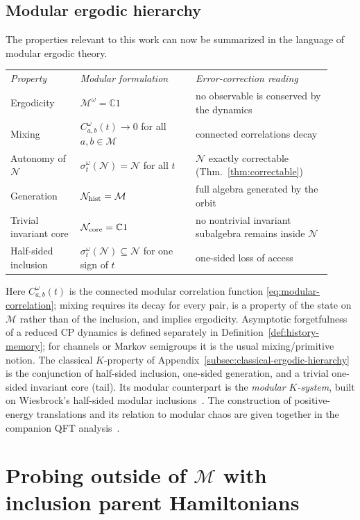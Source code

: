 \documentclass[a4paper,11pt]{article}
\theoremstyle{definition}
\newcommand{\mN}{\mathcal{N}}
\newcommand{\mM}{\mathcal{M}}
\begin{document}
\subsection{Modular ergodic hierarchy}\label{subsec:QEC-hierarchy}

The properties relevant to this work can now be summarized in the language of modular ergodic theory.
\begin{center}
\begin{tabular}{@{}>{\raggedright\arraybackslash}p{0.20\linewidth}>{\raggedright\arraybackslash}p{0.33\linewidth}>{\raggedright\arraybackslash}p{0.39\linewidth}@{}}
 \textit{Property} & \textit{Modular formulation} & \textit{Error-correction reading}\\[4pt]
 Ergodicity & $\mM^\omega=\mathbb C1$ & no observable is conserved by the dynamics\\
 Mixing & $C_{a,b}^\omega(t)\to0$ for all $a,b\in\mM$ & connected correlations decay\\
 Autonomy of $\mN$ & $\sigma^\omega_t(\mN)=\mN$ for all $t$ & $\mN$ exactly correctable (Thm.~\ref{thm:correctable})\\
 Generation & $\mN_{\rm hist}=\mM$ & full algebra generated by the orbit\\
 Trivial invariant core & $\mN_{\rm core}=\mathbb C1$ & no nontrivial invariant subalgebra remains inside $\mN$\\
 Half-sided inclusion & $\sigma^\omega_t(\mN)\subseteq\mN$ for one sign of $t$ & one-sided loss of access
\end{tabular}
\end{center}
Here $C^\omega_{a,b}(t)$ is the connected modular correlation function \eqref{eq:modular-correlation}; mixing requires its decay for every pair, is a property of the state on $\mM$ rather than of the inclusion, and implies ergodicity. Asymptotic forgetfulness of a reduced CP dynamics is defined separately in Definition~\ref{def:history-memory}; for channels or Markov semigroups it is the usual mixing/primitive notion. The classical $K$-property of Appendix~\ref{subsec:classical-ergodic-hierarchy} is the conjunction of half-sided inclusion, one-sided generation, and a trivial one-sided invariant core (tail). Its modular counterpart is the \emph{modular $K$-system}, built on
Wiesbrock's half-sided modular inclusions~\cite{Wiesbrock1993}.
The construction of positive-energy translations and its relation to
modular chaos are given together in the companion QFT analysis~\cite{companionQFT}.

\section{Probing outside of $\mM$ with inclusion parent Hamiltonians}
\label{sec:probing-outside-M}
\end{document}
